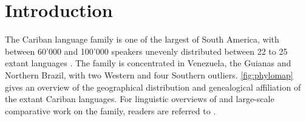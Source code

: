 \section{Introduction}
\label{sec:intro}
The Cariban language family is one of the largest of South America, with between 60'000 and 100'000 speakers unevenly distributed between 22 to 25 extant languages \parencite[441]{gildea2012classification}.
The family is concentrated in Venezuela, the Guianas and Northern Brazil, with two Western and four Southern outliers.
\cref{fig:phylomap} gives an overview of the geographical distribution and genealogical affiliation of the extant Cariban languages.
For linguistic overviews of and large-scale comparative work on the family, readers are referred to \textcites{gildea1998}{derbyshire1999carib}{meira2002first}{meira2005southern}{meira2006cariban}{gildea2007greenberg}{meira2010origin}{gildea2010story}{gildea2012classification}{matter2021cariban}{gildea2019overview}.






